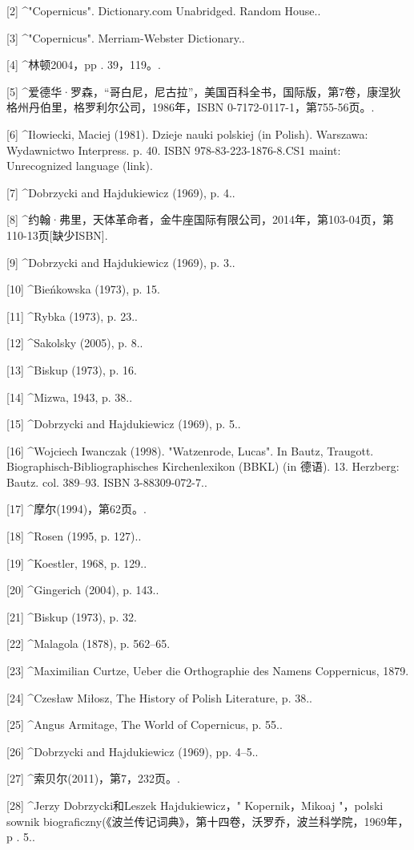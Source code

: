 [2]
^"Copernicus". Dictionary.com Unabridged. Random House..

[3]
^"Copernicus". Merriam-Webster Dictionary..

[4]
^林顿2004，pp . 39，119。.

[5]
^爱德华·罗森，“哥白尼，尼古拉”，美国百科全书，国际版，第7卷，康涅狄格州丹伯里，格罗利尔公司，1986年，ISBN 0-7172-0117-1，第755-56页。.

[6]
^Iłowiecki, Maciej (1981). Dzieje nauki polskiej (in Polish). Warszawa: Wydawnictwo Interpress. p. 40. ISBN 978-83-223-1876-8.CS1 maint: Unrecognized language (link).

[7]
^Dobrzycki and Hajdukiewicz (1969), p. 4..

[8]
^约翰·弗里，天体革命者，金牛座国际有限公司，2014年，第103-04页，第110-13页[缺少ISBN].

[9]
^Dobrzycki and Hajdukiewicz (1969), p. 3..

[10]
^Bieńkowska (1973), p. 15.

[11]
^Rybka (1973), p. 23..

[12]
^Sakolsky (2005), p. 8..

[13]
^Biskup (1973), p. 16.

[14]
^Mizwa, 1943, p. 38..

[15]
^Dobrzycki and Hajdukiewicz (1969), p. 5..

[16]
^Wojciech Iwanczak (1998). "Watzenrode, Lucas". In Bautz, Traugott. Biographisch-Bibliographisches Kirchenlexikon (BBKL) (in 德语). 13. Herzberg: Bautz. col. 389–93. ISBN 3-88309-072-7..

[17]
^摩尔(1994)，第62页。.

[18]
^Rosen (1995, p. 127)..

[19]
^Koestler, 1968, p. 129..

[20]
^Gingerich (2004), p. 143..

[21]
^Biskup (1973), p. 32.

[22]
^Malagola (1878), p. 562–65.

[23]
^Maximilian Curtze, Ueber die Orthographie des Namens Coppernicus, 1879.

[24]
^Czesław Miłosz, The History of Polish Literature, p. 38..

[25]
^Angus Armitage, The World of Copernicus, p. 55..

[26]
^Dobrzycki and Hajdukiewicz (1969), pp. 4–5..

[27]
^索贝尔(2011)，第7，232页。.

[28]
^Jerzy Dobrzycki和Leszek Hajdukiewicz，" Kopernik，Mikoaj "，polski sownik biograficzny(《波兰传记词典》，第十四卷，沃罗乔，波兰科学院，1969年，p . 5..

